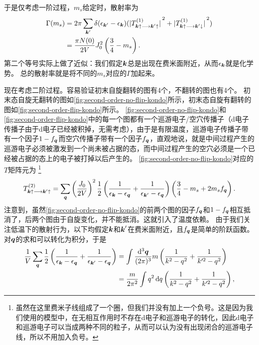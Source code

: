 于是仅考虑一阶过程，$m_s$给定时，散射率为
\begin{equation}
    \begin{aligned}
        \Gamma(m_s) &= 2\pi \sum_{\vb*{k}'} \delta(\epsilon_{\vb*{k}'} - \epsilon_{\vb*{k}}) (\abs*{T^{(1)}_{\vb*{k}\uparrow \longrightarrow \vb*{k}' \uparrow}}^2 + \abs*{T^{(1)}_{\vb*{k}\uparrow \longrightarrow \vb*{k}' \downarrow}}^2) \\
        &= \frac{\pi N(0)}{2 V} J_0^2 \left( \frac{3}{4} - m_s \right).
    \end{aligned}
\end{equation}
第二个等号实际上做了近似：我们假定$\vb*{k}$总是出现在费米面附近，从而$\epsilon_{\vb*{k}}$就是化学势。
总的散射率就是将不同的$m_s$对应的$\Gamma$加起来。

现在考虑二阶过程。容易验证初末自旋翻转的图有4个，不翻转的图也有4个。
初末态自旋无翻转的图如\autoref{fig:second-order-no-flip-kondo}所示，初末态自旋有翻转的图如\autoref{fig:second-order-flip-kondo}所示。
\autoref{fig:second-order-no-flip-kondo}和\autoref{fig:second-order-flip-kondo}中的每一个图都有一个巡游电子/空穴传播子（d电子传播子由于d电子已经被积掉，无需考虑），由于是有限温度，巡游电子传播子带有一个因子$1-f_{\vb*{q}}$而空穴传播子带有一个因子$f_{\vb*{q}}$，直观地说，就是中间过程产生的巡游电子必须被激发到一个尚未被占据的态，而中间过程产生的空穴必须是一个已经被占据的态上的电子被打掉以后产生的。
\autoref{fig:second-order-no-flip-kondo}对应的$T$矩阵元为%
\footnote{虽然在这里费米子线组成了一个圈，但我们并没有加上一个负号。这是因为我们使用的模型中，在无相互作用时不存在d电子和巡游电子的转化，因此d电子和巡游电子可以当成两种不同的粒子，从而可以认为没有出现闭合的巡游电子线，所以不用加入负号。}%
\begin{equation}
    T^{(2)}_{\vb*{k} \uparrow \longrightarrow \vb*{k}' \uparrow} = \sum_{\vb*{q}} \left( \frac{J_0}{2V} \right)^2 \frac{1}{2} \left( \frac{1}{\epsilon_{\vb*{k}} - \epsilon_{\vb*{q}}} + \frac{1}{\epsilon_{\vb*{k}'} - \epsilon_{\vb*{q}}} \right) \left( \frac{3}{4} - m_s + 2 m_s f_{\vb*{q}} \right).
    \label{eq:t-2-k-temp}
\end{equation}
注意到，虽然\autoref{fig:second-order-no-flip-kondo}的前两个图的因子$f_{\vb*{q}}$和$1-f_{\vb*{q}}$相互抵消了，后两个图由于自旋变化，并不能抵消。这就引入了温度依赖。
由于我们关注低温下的散射行为，以下均假定$\vb*{k}$和$\vb*{k}'$在费米面附近，且$f_{\vb*{q}}$是简单的阶跃函数。对$\vb*{q}$的求和可以转化为积分，于是
\[
    \begin{aligned}
        \frac{1}{V} \sum_{\vb*{q}} \frac{1}{2} \left( \frac{1}{\epsilon_{\vb*{k}} - \epsilon_{\vb*{q}}} + \frac{1}{\epsilon_{\vb*{k}'} - \epsilon_{\vb*{q}}} \right) &= \int \frac{\dd[3]{\vb*{q}}}{(2\pi)^3} m \left( \frac{1}{k^2 - q^2} + \frac{1}{k'^2 - q^2} \right) \\
        &= \frac{m}{2\pi^2} \int q^2 \dd{q} \left( \frac{1}{k^2 - q^2} + \frac{1}{k'^2 - q^2} \right),
    \end{aligned}
\]
